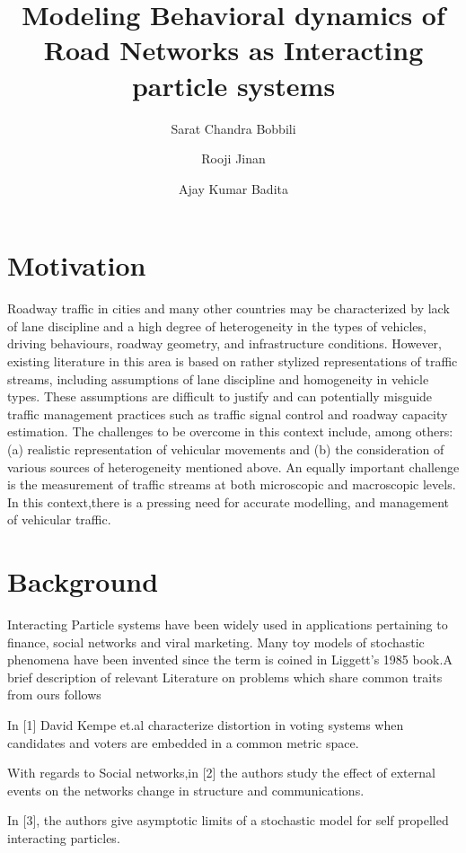 \documentclass[15pt, onecolumn]{article}
\title{\textbf{Modeling Behavioral dynamics of Road Networks as Interacting particle systems}}
\author{
Sarat Chandra Bobbili
\and 
Rooji Jinan
\and
Ajay Kumar Badita
}
\begin{document}
\date{}
\maketitle


\section*{Motivation}
Roadway traffic in cities and many other countries may be characterized by lack of lane discipline and a high degree of heterogeneity in the types of vehicles, driving behaviours, roadway geometry, and infrastructure conditions. However, existing literature in this area is based on rather stylized representations of traffic streams, including assumptions of lane discipline and homogeneity in vehicle types. These assumptions are difficult to justify and can potentially misguide traffic management practices such as traffic signal control and roadway capacity estimation. The challenges to be overcome in this context include, among others: (a) realistic representation of vehicular movements and (b) the consideration of various sources of heterogeneity mentioned above. An equally important challenge is the measurement of traffic streams at both microscopic and macroscopic levels. In this context,there is a pressing need for accurate modelling, and management of vehicular traffic.


\section*{Background}
Interacting Particle systems have been widely used in applications pertaining to finance, social networks and viral marketing. Many toy models of stochastic phenomena have been invented since the term is coined in Liggett's 1985 book.A brief description of relevant Literature on problems which share common traits from ours follows

In [1] David Kempe et.al characterize distortion in voting systems when candidates and voters are embedded in a common metric space. 

With regards to Social networks,in [2] the authors study the effect of external events on the networks change in structure and communications.

In [3], the authors give asymptotic limits of a stochastic model for self propelled interacting particles.
\end{document}
